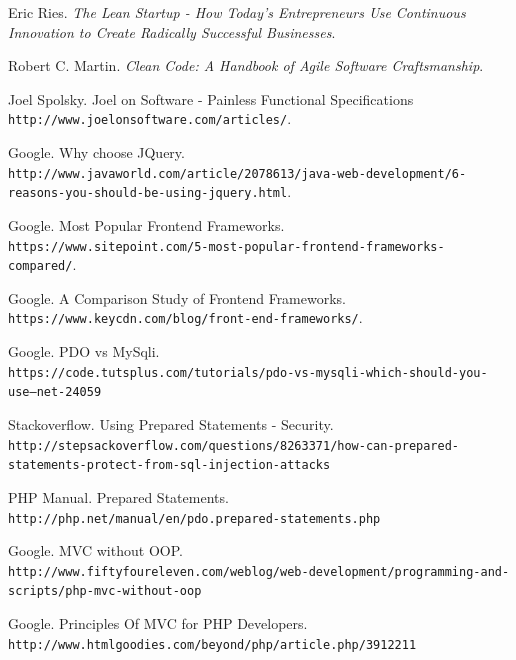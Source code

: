 \begin{thebibliography}{9}

Eric Ries. 
\textit{The Lean Startup - How Today's Entrepreneurs Use Continuous Innovation to Create Radically Successful Businesses}. 
 
Robert C. Martin.
\textit{Clean Code: A Handbook of Agile Software Craftsmanship}.

\bibitem{} 
Joel Spolsky. Joel on Software - Painless Functional Specifications
\\\texttt{http://www.joelonsoftware.com/articles/}.

\bibitem{} 
Google. Why choose JQuery.
\\\texttt{http://www.javaworld.com/article/2078613/java-web-development/6-reasons-you-should-be-using-jquery.html}.

\bibitem{} 
Google. Most Popular Frontend Frameworks.
\\\texttt{https://www.sitepoint.com/5-most-popular-frontend-frameworks-compared/}.

\bibitem{} 
Google. A Comparison Study of Frontend Frameworks.
\\\texttt{https://www.keycdn.com/blog/front-end-frameworks/}.

\bibitem{} 
Google. PDO vs MySqli.
\\\texttt{https://code.tutsplus.com/tutorials/pdo-vs-mysqli-which-should-you-use--net-24059}

\bibitem{} 
Stackoverflow. Using Prepared Statements - Security.
\\\texttt{http://stepsackoverflow.com/questions/8263371/how-can-prepared-statements-protect-from-sql-injection-attacks}

\bibitem{} 
PHP Manual. Prepared Statements.
\\\texttt{http://php.net/manual/en/pdo.prepared-statements.php}

\bibitem{} 
Google. MVC without OOP.
\\\texttt{http://www.fiftyfoureleven.com/weblog/web-development/programming-and-scripts/php-mvc-without-oop}


\bibitem{} 
Google. Principles Of MVC for PHP Developers.
\\\texttt{http://www.htmlgoodies.com/beyond/php/article.php/3912211}

\end{thebibliography}













 












